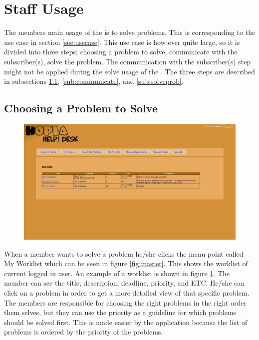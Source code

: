 \section{Staff Usage}
\label{sec:staff_usage}
The \astaff[] members main usage of the is to solve problems.
This is corresponding to the \ucsolproblem{} use case in section \ref{sec:usecase}.
This use case is how ever quite large, so it is divided into three steps; choosing a problem to solve, communicate with the subscriber(s), solve the problem.
The communication with the subscriber(s) step might not be applied during the solve usage of the \aclient[].
The three steps are described in subsections \ref{sub:probsolve}, \ref{sub:communicate}, and \ref{sub:solveprob}.

\subsection{Choosing a Problem to Solve}
\label{sub:probsolve}
\begin{figure}[H]
	\centering
		\includegraphics[width=1.00\textwidth, clip=true, trim=4cm 10.5cm 8cm 8cm]{input/implementation/program_presentation/worklist.png}
	\label{fig:worklist}
\end{figure}

When a \astaff[] member wants to solve a problem he/she clicks the menu point called My Worklist which can be seen in figure \ref{fig:master}.
This shows the worklist of current logged in \astaff[] user.
An example of a worklist is shown in figure \ref{fig:worklist}.
The \astaff[] member can see the title, description, deadline, priority, and ETC.
He/she can click on a problem in order to get a more detailed view of that specific problem.
The \astaff[] members are responsible for choosing the right problems in the right order them selves, but they can use the priority as a guideline for which problems should be solved first.
This is made easier by the application because the list of problems is ordered by the priority of the problems.


